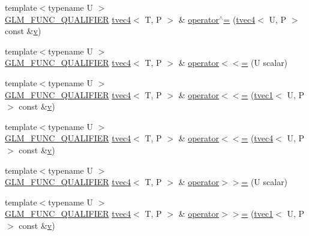 \begin{DoxyCompactItemize}
\item 
{\footnotesize template$<$typename U $>$ }\\\mbox{\hyperlink{setup_8hpp_a33fdea6f91c5f834105f7415e2a64407}{G\+L\+M\+\_\+\+F\+U\+N\+C\+\_\+\+Q\+U\+A\+L\+I\+F\+I\+ER}} \mbox{\hyperlink{structglm_1_1tvec4}{tvec4}}$<$ T, P $>$ \& \mbox{\hyperlink{structglm_1_1tvec4_afba73ecb49a4d69ef0e832b1e294e0ca}{operator$^\wedge$=}} (\mbox{\hyperlink{structglm_1_1tvec4}{tvec4}}$<$ U, P $>$ const \&\mbox{\hyperlink{glad_8h_a14cfbe2fc2234f5504618905b69d1e06}{v}})
\item 
{\footnotesize template$<$typename U $>$ }\\\mbox{\hyperlink{setup_8hpp_a33fdea6f91c5f834105f7415e2a64407}{G\+L\+M\+\_\+\+F\+U\+N\+C\+\_\+\+Q\+U\+A\+L\+I\+F\+I\+ER}} \mbox{\hyperlink{structglm_1_1tvec4}{tvec4}}$<$ T, P $>$ \& \mbox{\hyperlink{structglm_1_1tvec4_a2c231e01de8005887fd9c380f93009da}{operator$<$$<$=}} (U scalar)
\item 
{\footnotesize template$<$typename U $>$ }\\\mbox{\hyperlink{setup_8hpp_a33fdea6f91c5f834105f7415e2a64407}{G\+L\+M\+\_\+\+F\+U\+N\+C\+\_\+\+Q\+U\+A\+L\+I\+F\+I\+ER}} \mbox{\hyperlink{structglm_1_1tvec4}{tvec4}}$<$ T, P $>$ \& \mbox{\hyperlink{structglm_1_1tvec4_ac1b4567b5baff2c335edef8d30e73a80}{operator$<$$<$=}} (\mbox{\hyperlink{structglm_1_1tvec1}{tvec1}}$<$ U, P $>$ const \&\mbox{\hyperlink{glad_8h_a14cfbe2fc2234f5504618905b69d1e06}{v}})
\item 
{\footnotesize template$<$typename U $>$ }\\\mbox{\hyperlink{setup_8hpp_a33fdea6f91c5f834105f7415e2a64407}{G\+L\+M\+\_\+\+F\+U\+N\+C\+\_\+\+Q\+U\+A\+L\+I\+F\+I\+ER}} \mbox{\hyperlink{structglm_1_1tvec4}{tvec4}}$<$ T, P $>$ \& \mbox{\hyperlink{structglm_1_1tvec4_ab39a99917d9c3a7b93c1cf5cbfa93025}{operator$<$$<$=}} (\mbox{\hyperlink{structglm_1_1tvec4}{tvec4}}$<$ U, P $>$ const \&\mbox{\hyperlink{glad_8h_a14cfbe2fc2234f5504618905b69d1e06}{v}})
\item 
{\footnotesize template$<$typename U $>$ }\\\mbox{\hyperlink{setup_8hpp_a33fdea6f91c5f834105f7415e2a64407}{G\+L\+M\+\_\+\+F\+U\+N\+C\+\_\+\+Q\+U\+A\+L\+I\+F\+I\+ER}} \mbox{\hyperlink{structglm_1_1tvec4}{tvec4}}$<$ T, P $>$ \& \mbox{\hyperlink{structglm_1_1tvec4_a538540f7df0325aa90d503b150dfa561}{operator$>$$>$=}} (U scalar)
\item 
{\footnotesize template$<$typename U $>$ }\\\mbox{\hyperlink{setup_8hpp_a33fdea6f91c5f834105f7415e2a64407}{G\+L\+M\+\_\+\+F\+U\+N\+C\+\_\+\+Q\+U\+A\+L\+I\+F\+I\+ER}} \mbox{\hyperlink{structglm_1_1tvec4}{tvec4}}$<$ T, P $>$ \& \mbox{\hyperlink{structglm_1_1tvec4_abfcea840ccebe4a644d60116955529ce}{operator$>$$>$=}} (\mbox{\hyperlink{structglm_1_1tvec1}{tvec1}}$<$ U, P $>$ const \&\mbox{\hyperlink{glad_8h_a14cfbe2fc2234f5504618905b69d1e06}{v}})

\end{DoxyCompactItemize}
